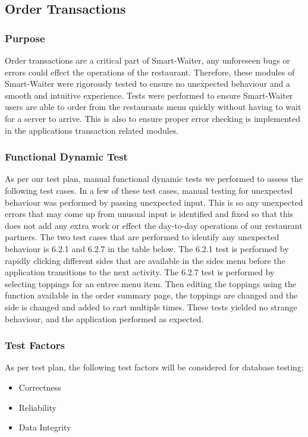 \documentclass[12pt, titlepage]{article}
\begin{document}
\subsection{Order Transactions}

\subsubsection{Purpose}
Order transactions are a critical part of Smart-Waiter, any unforeseen bugs or errors could effect the operations of the restaurant. Therefore, these modules of Smart-Waiter were rigorously tested to ensure no unexpected behaviour and a smooth and intuitive experience. Tests were performed to ensure Smart-Waiter users are able to order from the restaurants menu quickly without having to wait for a server to arrive. This is also to ensure proper error checking is implemented in the applications transaction related modules.

\subsubsection{Functional Dynamic Test}
As per our test plan, manual functional dynamic tests we performed to assess the following test cases. In a few of these test cases, manual testing for unexpected behaviour was performed by passing unexpected input. This is so any unexpected errors that may come up from unusual input is identified and fixed so that this does not add any extra work or effect the day-to-day operations of our restaurant partners. The two test cases that are performed to identify any unexpected behaviour is 6.2.1 and 6.2.7 in the table below. The 6.2.1 test is performed by rapidly clicking different sides that are available in the sides menu before the application transitions to the next activity. The 6.2.7 test is performed by selecting toppings for an entree menu item. Then editing the toppings using the function available in the order summary page, the toppings are changed and the side is changed and added to cart multiple times. These tests yielded no strange behaviour, and the application performed as expected. 


\subsubsection{Test Factors}
As per test plan, the following test factors will be considered for database testing;
\begin{itemize}
 \item Correctness
 \item Reliability
 \item Data Integrity
 \end{itemize}
\end{document}
